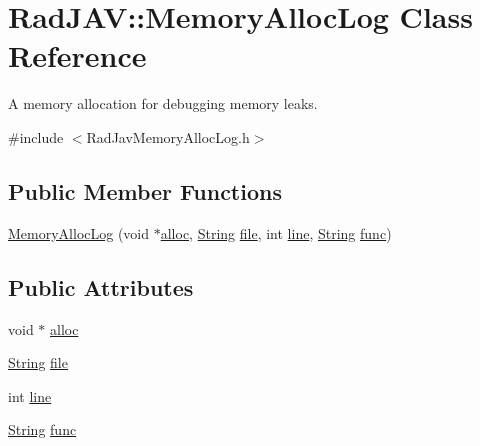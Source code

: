 \hypertarget{class_rad_j_a_v_1_1_memory_alloc_log}{}\section{Rad\+J\+AV\+:\+:Memory\+Alloc\+Log Class Reference}
\label{class_rad_j_a_v_1_1_memory_alloc_log}


A memory allocation for debugging memory leaks.  




{\ttfamily \#include $<$Rad\+Jav\+Memory\+Alloc\+Log.\+h$>$}

\subsection*{Public Member Functions}
\begin{DoxyCompactItemize}
\item 
\mbox{\hyperlink{class_rad_j_a_v_1_1_memory_alloc_log_a8c53e87a22849fe197eb32c3f3f8d7cb}{Memory\+Alloc\+Log}} (void $\ast$\mbox{\hyperlink{class_rad_j_a_v_1_1_memory_alloc_log_a5b0962bf8bcffef546a65b2a6372b71b}{alloc}}, \mbox{\hyperlink{class_rad_j_a_v_1_1_string}{String}} \mbox{\hyperlink{class_rad_j_a_v_1_1_memory_alloc_log_af5ccd48160e7686802ebaefdf8953339}{file}}, int \mbox{\hyperlink{class_rad_j_a_v_1_1_memory_alloc_log_a4676d9c4d075e55f7c064587fa920fd9}{line}}, \mbox{\hyperlink{class_rad_j_a_v_1_1_string}{String}} \mbox{\hyperlink{class_rad_j_a_v_1_1_memory_alloc_log_acd56dbfe737d084f4d54911f35a61352}{func}})
\end{DoxyCompactItemize}
\subsection*{Public Attributes}
\begin{DoxyCompactItemize}
\item 
void $\ast$ \mbox{\hyperlink{class_rad_j_a_v_1_1_memory_alloc_log_a5b0962bf8bcffef546a65b2a6372b71b}{alloc}}
\item 
\mbox{\hyperlink{class_rad_j_a_v_1_1_string}{String}} \mbox{\hyperlink{class_rad_j_a_v_1_1_memory_alloc_log_af5ccd48160e7686802ebaefdf8953339}{file}}
\item 
int \mbox{\hyperlink{class_rad_j_a_v_1_1_memory_alloc_log_a4676d9c4d075e55f7c064587fa920fd9}{line}}
\item 
\mbox{\hyperlink{class_rad_j_a_v_1_1_string}{String}} \mbox{\hyperlink{class_rad_j_a_v_1_1_memory_alloc_log_acd56dbfe737d084f4d54911f35a61352}{func}}
\end{DoxyCompactItemize}



